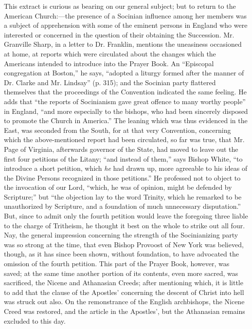 This extract is curious as bearing on our general
subject; but to return to the American Church:—the presence of a
Socinian influence among her members was a subject of apprehension
with some of the eminent persons in England who were interested or
concerned in the question of their obtaining the Succession. Mr.
Granville Sharp, in a letter to Dr. Franklin, mentions the uneasiness
occasioned at home, at reports which were circulated about the changes
which the Americans intended to introduce into the Prayer Book. An ``Episcopal
congregation at Boston,'' he says, ``adopted a liturgy formed after the
manner of Dr. Clarke and Mr. Lindsay'' (p. 315); and the Socinian party
flattered themselves that the proceedings of the Convention indicated
the same feeling. He adds that ``the reports of Socinianism gave great
offence to many worthy people'' in England, ``and more especially to the
bishops, who had been sincerely disposed to promote the Church in
America.'' The leaning which was thus evidenced in the East, was
seconded from the South, for at that very Convention, concerning which
the above-mentioned report had been circulated, so far was true, that
Mr. Page of Virginia, afterwards governor of the State, had moved to
leave out the first four petitions of the Litany; ``and instead of
them,'' says Bishop White, ``to introduce a short petition, which \emph{he} had
drawn up, more agreeable to his ideas of the Divine Persons recognized
in those petitions.'' He professed not to object to the invocation of
our Lord, ``which, he was of opinion, might be defended by Scripture;''
but ``the objection lay to the word Trinity, which he remarked to
be unauthorized by Scripture, and a foundation of much unnecessary
disputation.'' But, since to admit only the fourth petition would leave
the foregoing three liable to the charge of Tritheism, he thought it
best on the whole to strike out all four. Nay, the general impression
concerning the strength of the Socinianizing party was so strong at
the time, that even Bishop Provoost of New York was believed, though,
as it has since been shown, without foundation, to have advocated the
omission of the fourth petition. This part of the Prayer Book,
however, was saved; at the same time another portion of its contents,
even more sacred, was sacrificed, the Nicene and Athanasian Creeds;
after mentioning which, it is little to add that the clause of the
Apostles' concerning the descent of Christ into hell was struck out
also. On the remonstrance of the English archbishops, the Nicene Creed
was restored, and the article in the Apostles', but the Athanasian
remains excluded to this day.

